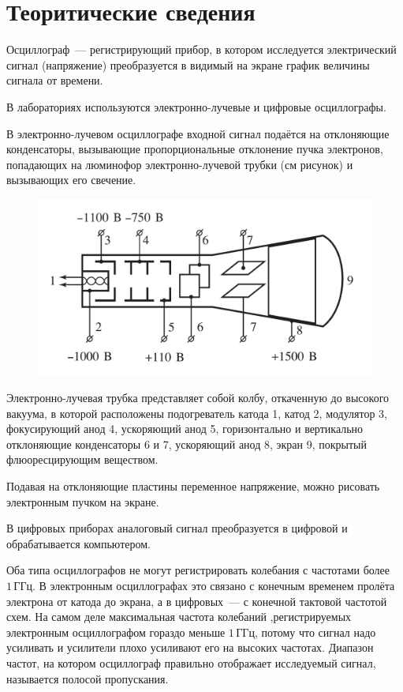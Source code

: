 \section{Теоритические сведения}
Осциллограф~--- регистрирующий прибор, в котором исследуется электрический сигнал
(напряжение) преобразуется в видимый на экране график величины сигнала от времени.

В лабораториях используются электронно-лучевые и цифровые осциллографы.

В электронно-лучевом осциллографе входной сигнал подаётся на отклоняющие конденсаторы,
вызывающие пропорциональные отклонение пучка электронов, попадающих на люминофор
электронно-лучевой трубки (см рисунок) и вызывающих его свечение.

\begin{figure}[ht!]
    \centering
    \includegraphics[width=0.8\linewidth]{img/picture1.png}
\end{figure}

Электронно-лучевая трубка представляет собой колбу, откаченную до высокого вакуума,
в которой расположены подогреватель катода 1, катод 2, модулятор 3, фокусирующий
анод 4, ускоряющий анод 5, горизонтально и вертикально отклоняющие конденсаторы 6 и 7,
ускоряющий анод 8, экран 9, покрытый флюоресцирующим веществом.

Подавая на отклоняющие пластины переменное напряжение, можно рисовать электронным
пучком на экране. 

В цифровых приборах аналоговый сигнал преобразуется в цифровой и обрабатывается
компьютером.

Оба типа осциллографов не могут регистрировать колебания с частотами более $1\,\text{ГГц}$.
В электронным осциллографах это связано с конечным временем пролёта электрона от катода до
экрана, а в цифровых~--- с конечной тактовой частотой схем. На самом деле максимальная
частота колебаний ,регистрируемых электронным осциллографом гораздо меньше $1\,\text{ГГц}$,
потому что сигнал надо усиливать и усилители плохо усиливают его на высоких частотах.
Диапазон частот, на котором осциллограф правильно отображает исследуемый сигнал, называется
полосой пропускания.

